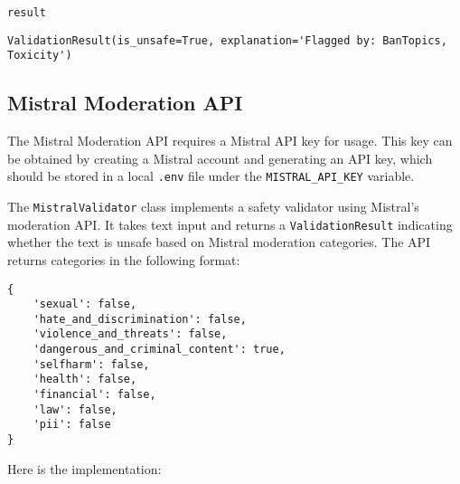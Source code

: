 \begin{verbatim}
result
\end{verbatim}

\begin{verbatim}
ValidationResult(is_unsafe=True, explanation='Flagged by: BanTopics, Toxicity')
\end{verbatim}

\subsection{Mistral Moderation API}

The Mistral Moderation API requires a Mistral API key for usage. This key can be obtained by creating a Mistral account and generating an API key, which should be stored in a local \texttt{.env} file under the \texttt{MISTRAL\_API\_KEY} variable.

The \texttt{MistralValidator} class implements a safety validator using Mistral's moderation API. It takes text input and returns a \texttt{ValidationResult} indicating whether the text is unsafe based on Mistral moderation categories. The API returns categories in the following format:

\begin{verbatim}
{
    'sexual': false,
    'hate_and_discrimination': false,
    'violence_and_threats': false,
    'dangerous_and_criminal_content': true,
    'selfharm': false,
    'health': false,
    'financial': false,
    'law': false,
    'pii': false
}
\end{verbatim}

Here is the implementation:

